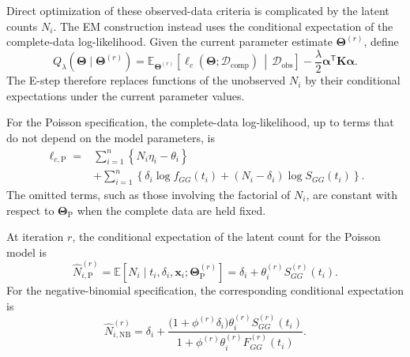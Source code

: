 Direct optimization of these observed-data criteria is complicated by
the latent counts $N_i$. The EM construction instead uses the
conditional expectation of the complete-data log-likelihood. Given the
current parameter estimate $\bm\Theta^{(r)}$, define
\begin{equation}
    Q_{\lambda}
    \left(
        \bm\Theta
        \mid
        \bm\Theta^{(r)}
    \right)
    =
    \mathbb E_{\bm\Theta^{(r)}}
    \left[
        \ell_c
        \left(
            \bm\Theta;
            \mathcal D_{\mathrm{comp}}
        \right)
        \,\middle|\,
        \mathcal D_{\mathrm{obs}}
    \right]
    -
    \frac{\lambda}{2}
    \bm{\alpha}^{\mathsf T}
    \bm K
    \bm{\alpha}.
    \label{eq:penalized-Q-function}
\end{equation}
The E-step therefore replaces functions of the unobserved $N_i$ by
their conditional expectations under the current parameter values.

For the Poisson specification, the complete-data log-likelihood,
up to terms that do not depend on the model parameters, is
\begin{equation}
    \begin{aligned}
        \ell_{c,\mathrm P}
        ={}&
        \sum_{i=1}^{n}
        \left\{
            N_i\eta_i-\theta_i
        \right\}\\
        &+
        \sum_{i=1}^{n}
        \left\{
            \delta_i\log f_{GG}(t_i)
            +
            (N_i-\delta_i)
            \log S_{GG}(t_i)
        \right\}.
    \end{aligned}
    \label{eq:poisson-complete-data}
\end{equation}
The omitted terms, such as those involving the factorial of $N_i$,
are constant with respect to $\bm\Theta_{\mathrm P}$ when the complete
data are held fixed.

At iteration $r$, the conditional expectation of the latent count for
the Poisson model is
\begin{equation}
    \widehat N_{i,\mathrm P}^{(r)}
    =
    \mathbb E
    \left[
        N_i
        \mid
        t_i,\delta_i,\bm{x}_i;
        \bm\Theta_{\mathrm P}^{(r)}
    \right]
    =
    \delta_i
    +
    \theta_i^{(r)}
    S_{GG}^{(r)}(t_i).
    \label{eq:poisson-estep}
\end{equation}
For the negative-binomial specification, the corresponding conditional
expectation is
\begin{equation}
    \widehat N_{i,\mathrm{NB}}^{(r)}
    =
    \delta_i
    +
    \frac{
        \bigl(1+\phi^{(r)}\delta_i\bigr)
        \theta_i^{(r)}
        S_{GG}^{(r)}(t_i)
    }{
        1+
        \phi^{(r)}
        \theta_i^{(r)}
        F_{GG}^{(r)}(t_i)
    }.
    \label{eq:nb-estep}
\end{equation}

